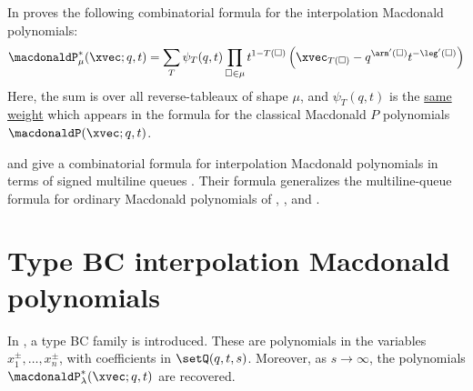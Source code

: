 In \cite{Okounkov1998shifted}  proves the following combinatorial formula for
the interpolation Macdonald polynomials:
\[
\macdonaldP^*_\mu(\xvec;q,t) =
\sum_T \psi_{T}(q,t)  \prod_{\square \in \mu} t^{1-T(\square)} \left( \xvec_{T(\square)} - q^{\arm'(\square)} t^{-\leg'(\square)
} \right)
\]
Here, the sum is over all reverse-tableaux of shape $\mu$,
and $\psi_{T}(q,t)$ is the \hyperref[macdonaldPTableauFormula]{same weight} which appears in the formula for
the classical Macdonald $P$ polynomials $\macdonaldP(\xvec;q,t)$.

 and  give a combinatorial
formula for interpolation Macdonald polynomials in terms of signed multiline
queues \cite{DaliWilliams2025x}.  Their formula generalizes the
multiline-queue formula for ordinary Macdonald polynomials of
, , and .


\section[macdonaldPiBC]{Type BC interpolation Macdonald polynomials}

In \cite{Okounkov1998}, a type BC family is introduced.
These are polynomials in the variables $x_1^{\pm},\dotsc,x_n^{\pm}$,
with coefficients in $\setQ(q,t,s)$.
Moreover, as $s\to \infty$, the polynomials $\macdonaldP^*_\lambda(\xvec;q,t)$ are
recovered.


